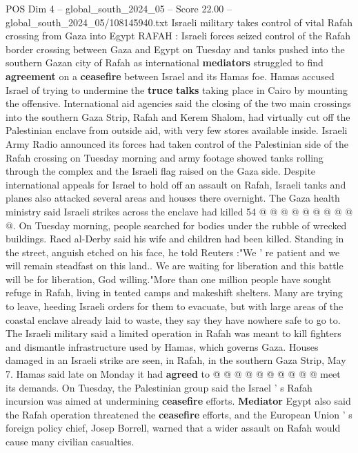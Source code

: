 \begin{textsample}{POS Dim 4 – global\_south\_2024\_05 – Score 22.00 – global\_south\_2024\_05/108145940.txt}  \label{ex:f4_pos_187}
Israeli military takes control of vital Rafah crossing from Gaza into Egypt RAFAH : Israeli forces seized control of the Rafah border crossing between Gaza and Egypt on Tuesday and tanks pushed into the southern Gazan city of Rafah as international \textbf{mediators} struggled to find \textbf{agreement} on a \textbf{ceasefire} between Israel and its Hamas foe.
Hamas accused Israel of trying to undermine the \textbf{truce} \textbf{talks} taking place in Cairo by mounting the offensive.
International aid agencies said the closing of the two main crossings into the southern Gaza Strip, Rafah and Kerem Shalom, had virtually cut off the Palestinian enclave from outside aid, with very few stores available inside.
Israeli Army Radio announced its forces had taken control of the Palestinian side of the Rafah crossing on Tuesday morning and army footage showed tanks rolling through the complex and the Israeli flag raised on the Gaza side.
Despite international appeals for Israel to hold off an assault on Rafah, Israeli tanks and planes also attacked several areas and houses there overnight.
The Gaza health ministry said Israeli strikes across the enclave had killed 54 @ @ @ @ @ @ @ @ @ @.
On Tuesday morning, people searched for bodies under the rubble of wrecked buildings.
Raed al-Derby said his wife and children had been killed.
Standing in the street, anguish etched on his face, he told Reuters :"We ' re patient and we will remain steadfast on this land..
We are waiting for liberation and this battle will be for liberation, God willing."More than one million people have sought refuge in Rafah, living in tented camps and makeshift shelters.
Many are trying to leave, heeding Israeli orders for them to evacuate, but with large areas of the coastal enclave already laid to waste, they say they have nowhere safe to go to.
The Israeli military said a limited operation in Rafah was meant to kill fighters and dismantle infrastructure used by Hamas, which governs Gaza.
Houses damaged in an Israeli strike are seen, in Rafah, in the southern Gaza Strip, May 7.
Hamas said late on Monday it had \textbf{agreed} to @ @ @ @ @ @ @ @ @ @ meet its demands.
On Tuesday, the Palestinian group said the Israel ' s Rafah incursion was aimed at undermining \textbf{ceasefire} efforts. \textbf{Mediator} Egypt also said the Rafah operation threatened the \textbf{ceasefire} efforts, and the European Union ' s foreign policy chief, Josep Borrell, warned that a wider assault on Rafah would cause many civilian casualties.

\end{textsample}
